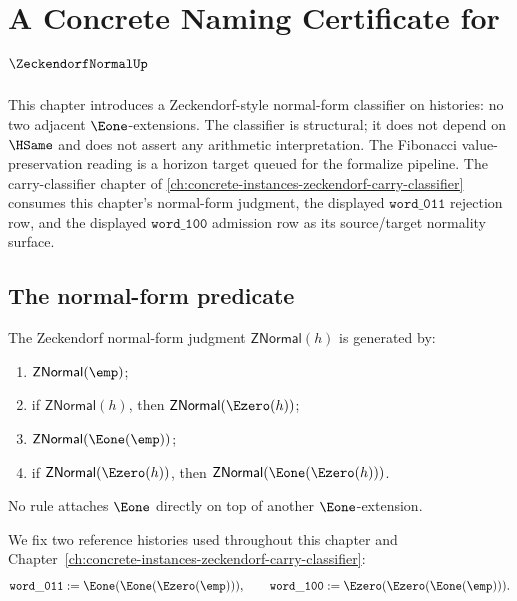 \chapter{A Concrete Naming Certificate for $\ZeckendorfNormalUp$}
\label{ch:concrete-instances-zeckendorf-normal-namecert}

This chapter introduces a Zeckendorf-style normal-form classifier on histories: no two adjacent \(\Eone\)-extensions. The classifier is structural; it does not depend on \(\HSame\) and does not assert any arithmetic interpretation. The Fibonacci value-preservation reading is a horizon target queued for the formalize pipeline. The carry-classifier chapter of \autoref{ch:concrete-instances-zeckendorf-carry-classifier} consumes this chapter's normal-form judgment, the displayed $\mathtt{word\_011}$ rejection row, and the displayed $\mathtt{word\_100}$ admission row as its source/target normality surface.

\section{The normal-form predicate}

\begin{definition}
\label{def:zeckendorf-normal-form-judgment}
The Zeckendorf normal-form judgment \(\mathsf{ZNormal}(h)\) is generated by:
\begin{enumerate}
  \item \(\mathsf{ZNormal}(\emp)\);
  \item if \(\mathsf{ZNormal}(h)\), then \(\mathsf{ZNormal}(\Ezero(h))\);
  \item \(\mathsf{ZNormal}(\Eone(\emp))\);
  \item if \(\mathsf{ZNormal}(\Ezero(h))\), then \(\mathsf{ZNormal}(\Eone(\Ezero(h)))\).
\end{enumerate}
No rule attaches \(\Eone\) directly on top of another \(\Eone\)-extension.
\end{definition}

\begin{definition}
\label{def:axiszeckendorf-display-words}
We fix two reference histories used throughout this chapter and Chapter~\ref{ch:concrete-instances-zeckendorf-carry-classifier}:
$$
  \mathtt{word\_011}
  := \Eone(\Eone(\Ezero(\emp))),
  \qquad
  \mathtt{word\_100}
  := \Ezero(\Ezero(\Eone(\emp))).
$$
\end{definition}

